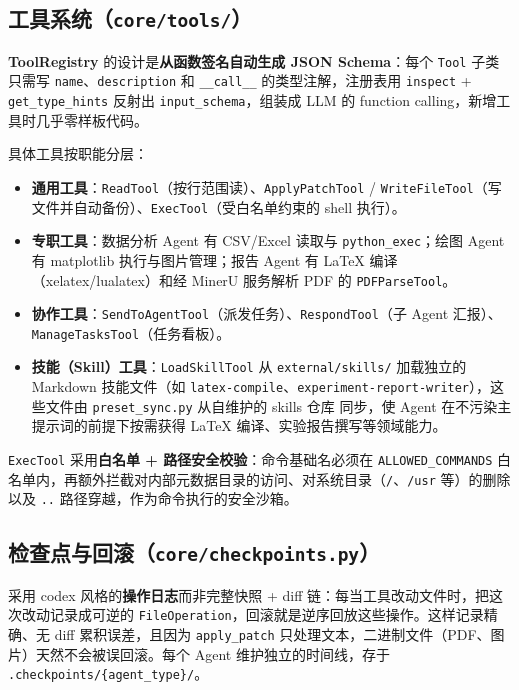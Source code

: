 \documentclass[a4paper,11pt]{article}
\begin{document}
\subsection{工具系统（\texttt{core/tools/}）}

\textbf{ToolRegistry} 的设计是\textbf{从函数签名自动生成 JSON Schema}：每个 \texttt{Tool} 子类只需写 \texttt{name}、\texttt{description} 和 \texttt{\_\_call\_\_} 的类型注解，注册表用 \texttt{inspect} + \texttt{get\_type\_hints} 反射出 \texttt{input\_schema}，组装成 LLM 的 function calling，新增工具时几乎零样板代码。

具体工具按职能分层：

\begin{itemize}[leftmargin=1.4em,itemsep=2pt]
  \item \textbf{通用工具}：\texttt{ReadTool}（按行范围读）、\texttt{ApplyPatchTool} / \texttt{WriteFileTool}（写文件并自动备份）、\texttt{ExecTool}（受白名单约束的 shell 执行）。
  \item \textbf{专职工具}：数据分析 Agent 有 CSV/Excel 读取与 \texttt{python\_exec}；绘图 Agent 有 matplotlib 执行与图片管理；报告 Agent 有 LaTeX 编译（xelatex/lualatex）和经 MinerU\cite{mineru} 服务解析 PDF 的 \texttt{PDFParseTool}。
  \item \textbf{协作工具}：\texttt{SendToAgentTool}（派发任务）、\texttt{RespondTool}（子 Agent 汇报）、\texttt{ManageTasksTool}（任务看板）。
  \item \textbf{技能（Skill）工具}：\texttt{LoadSkillTool} 从 \texttt{external/skills/} 加载独立的 Markdown 技能文件（如 \texttt{latex-compile}、\texttt{experiment-report-writer}），这些文件由 \texttt{preset\_sync.py} 从自维护的 skills 仓库\cite{skills} 同步，使 Agent 在不污染主提示词的前提下按需获得 LaTeX 编译、实验报告撰写等领域能力。
\end{itemize}

\texttt{ExecTool} 采用\textbf{白名单 + 路径安全校验}：命令基础名必须在 \texttt{ALLOWED\_COMMANDS} 白名单内，再额外拦截对内部元数据目录的访问、对系统目录（\texttt{/}、\texttt{/usr} 等）的删除以及 \texttt{..} 路径穿越，作为命令执行的安全沙箱。

\subsection{检查点与回滚（\texttt{core/checkpoints.py}）}

采用 codex\cite{codex} 风格的\textbf{操作日志}而非完整快照 + diff 链：每当工具改动文件时，把这次改动记录成可逆的 \texttt{FileOperation}，回滚就是逆序回放这些操作。这样记录精确、无 diff 累积误差，且因为 \texttt{apply\_patch} 只处理文本，二进制文件（PDF、图片）天然不会被误回滚。每个 Agent 维护独立的时间线，存于 \texttt{.checkpoints/\{agent\_type\}/}。
\end{document}
